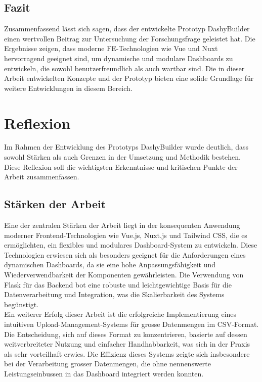 \documentclass[a4paper, 12pt]{scrartcl}
\begin{document}
\subsection{Fazit}
Zusammenfassend lässt sich sagen, dass der entwickelte Prototyp DashyBuilder einen wertvollen Beitrag zur Untersuchung der Forschungsfrage geleistet hat. Die Ergebnisse zeigen, dass moderne \ac{FE}-Technologien wie \ac{Vue} und \ac{Nuxt} hervorragend geeignet sind, um dynamische und modulare Dashboards zu entwickeln, die sowohl benutzerfreundlich als auch wartbar sind. Die in dieser Arbeit entwickelten Konzepte und der Prototyp bieten eine solide Grundlage für weitere Entwicklungen in diesem Bereich.
\clearpage
	\section{Reflexion }
	\label{sec:reflexion}
Im Rahmen der Entwicklung des Prototyps DashyBuilder wurde deutlich, dass sowohl Stärken als auch Grenzen in der Umsetzung und Methodik bestehen. Diese Reflexion soll die wichtigsten Erkenntnisse und kritischen Punkte der Arbeit zusammenfassen. 

\subsection{Stärken der Arbeit}
Eine der zentralen Stärken der Arbeit liegt in der konsequenten Anwendung moderner Frontend-Technologien wie Vue.js, Nuxt.js und Tailwind CSS, die es ermöglichten, ein flexibles und modulares Dashboard-System zu entwickeln. Diese Technologien erwiesen sich als besonders geeignet für die Anforderungen eines dynamischen Dashboards, da sie eine hohe Anpassungsfähigkeit und Wiederverwendbarkeit der Komponenten gewährleisten. Die Verwendung von Flask für das Backend bot eine robuste und leichtgewichtige Basis für die Datenverarbeitung und Integration, was die Skalierbarkeit des Systems begünstigt.\\[1em]Ein weiterer Erfolg dieser Arbeit ist die erfolgreiche Implementierung eines intuitiven Upload-Management-Systems für grosse Datenmengen im CSV-Format. Die Entscheidung, sich auf dieses Format zu konzentrieren, basierte auf dessen weitverbreiteter Nutzung und einfacher Handhabbarkeit, was sich in der Praxis als sehr vorteilhaft erwies. Die Effizienz dieses Systems zeigte sich insbesondere bei der Verarbeitung grosser Datenmengen, die ohne nennenswerte Leistungseinbussen in das Dashboard integriert werden konnten.
\end{document}
